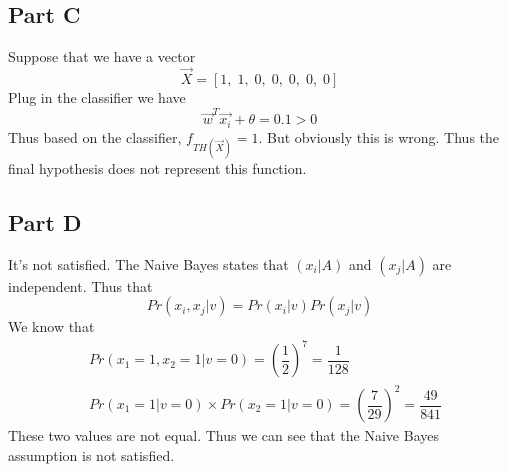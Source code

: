 \subsection{Part C}
Suppose that we have a vector 
\[\vec{X}=[1,\;1,\;0,\;0,\;0,\;0,\;0] \]
Plug in the classifier we have 
\[ \vec{w}^T \vec{x_i} + \theta =0.1>0 \]
Thus based on the classifier, $f_{TH(\vec{X})}=1$. But obviously this is wrong. Thus the final hypothesis does not represent this function.

\subsection{Part D}
It's not satisfied. The Naive Bayes states that $(x_i|A)$ and $(x_j|A)$ are independent. Thus that 
\[ Pr(x_i,x_j|v)=Pr(x_i|v)Pr(x_j|v) \]
We know that 
\begin{align*}
& Pr(x_1=1,x_2=1|v=0) = {(\dfrac{1}{2})}^7=\dfrac{1}{128} \\
& Pr(x_1=1|v=0)\times Pr(x_2=1|v=0)={(\dfrac{7}{29})}^2=\dfrac{49}{841}
\end{align*}
These two values are not equal. Thus we can see that the Naive Bayes assumption is not satisfied.

